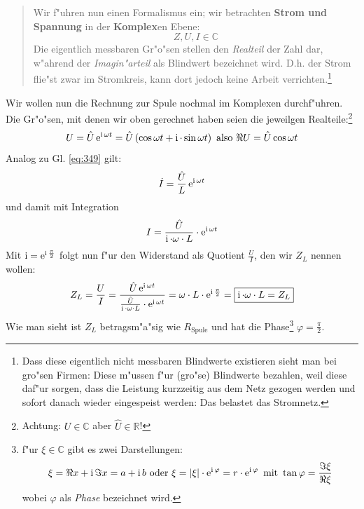\abs
\begin{quote}
Wir f"uhren nun einen Formalismus ein; wir betrachten \textbf{Strom und
Spannung} in der \textbf{Komplex}en Ebene:
\begin{equation*}
   \label{eq:352}
   Z, U, I \in \mathbb C
\end{equation*}
Die eigentlich messbaren Gr"o"sen stellen den \emph{Realteil} der Zahl
dar, w"ahrend der \emph{Imagin"arteil} als Blindwert bezeichnet
wird. D.h. der Strom flie"st zwar im Stromkreis, kann dort jedoch keine
Arbeit verrichten.\footnote{Dass diese eigentlich nicht messbaren
  Blindwerte existieren sieht man bei gro"sen Firmen: Diese m"ussen f"ur
  (gro"se) Blindwerte bezahlen, weil diese daf"ur sorgen, dass die
  Leistung kurzzeitig aus dem Netz gezogen werden und sofort danach
  wieder eingespeist werden: Das belastet das Stromnetz.}
\end{quote}






\abs
Wir wollen nun die Rechnung zur Spule nochmal im Komplexen
durchf"uhren. Die Gr"o"sen, mit denen wir oben gerechnet haben seien die
jeweilgen Realteile:\footnote{Achtung: $U \in \mathbb C$ aber $\hat U
  \in \mathbb R$!}
\begin{equation}
   \label{eq:353}
   U = \hat U \operatorname{e}^{\operatorname{i} \omega t} = \hat U \left ( \cos \omega t +  \operatorname{i} \cdot
       \sin \omega t \right ) \text{ also } \Re U = \hat U \cos \omega t
\end{equation}
Analog zu Gl. \eqref{eq:349} gilt:
\begin{equation}
   \label{eq:354}
   \dot I = \frac{\hat U}{L} \operatorname{e}^{\operatorname{i} \omega t}
\end{equation}
und damit mit Integration
\begin{equation}
   \label{eq:355}
   I = \frac{\hat U}{\operatorname{i} \cdot \omega \cdot L} \cdot \operatorname{e} ^{\operatorname{i} \omega t}
\end{equation}
Mit $\operatorname{i} = \operatorname{e}^{\operatorname{i}\frac{\pi}{2}}$ folgt nun f"ur den Widerstand als
Quotient $\frac{U}{I}$, den wir $Z_L$  nennen wollen:
\begin{equation}
   \label{eqn_kompl_widerst_spule}
  Z_L = \frac{U}{I} = \frac{ \hat U \operatorname{e}^{\operatorname{i} \omega t}}{ \frac{\hat U}{\operatorname{i}
       \cdot \omega \cdot L} \cdot \operatorname{e} ^{\operatorname{i} \omega t}} = \omega \cdot L
   \cdot \operatorname{e}^{\operatorname{i} \frac{\pi}{2}} = \boxed{ \operatorname{i} \cdot \omega \cdot L = Z_L}
\end{equation}
Wie man sieht ist $Z_L$ betragsm"a"sig wie $R_\text{Spule}$ und hat die
Phase\footnote{f"ur $\xi \in \mathbb C$ gibt es zwei
  Darstellungen: $$\xi = \Re x + \operatorname{i} \Im x = a + \operatorname{i} b \text{ oder }
  \xi = |\xi| \cdot \operatorname{e} ^{\operatorname{i} \varphi} = r \cdot \operatorname{e}^{\operatorname{i} \varphi} \text{
    mit } \tan\varphi = \frac{\Im
  \xi}{\Re \xi}$$ wobei
$\varphi$ als \emph{Phase} bezeichnet wird.} $\varphi =
\frac{\pi}{2}$.

